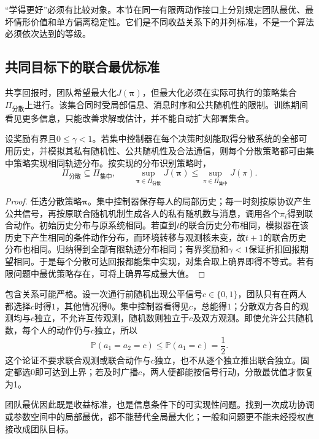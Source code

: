 “学得更好”必须有比较对象。本节在同一有限两动作接口上分别规定团队最优、最坏情形价值和单方偏离稳定性。它们是不同收益关系下的并列标准，不是一个算法必须依次达到的等级。

\subsection{共同目标下的联合最优标准}
\label{sec:rl-multi-agent-team}

共享回报时，团队希望最大化$J(\bm\pi)$，但最大化必须在实际可执行的策略集合$\Pi_{\text{分散}}$上进行。该集合同时受局部信息、消息时序和公共随机性的限制。训练期间看见更多信息，只能改善求解或估计，并不能自动扩大部署集合。

\begin{theorem}[集中与分散策略的可行集合]
\label{thm:rl-multi-agent-inclusion}
设奖励有界且$0\leq\gamma<1$。若集中控制器在每个决策时刻能取得分散系统的全部可用历史，并模拟其私有随机性、公共随机性及合法通信，则每个分散策略都可由集中策略实现相同轨迹分布。按实现的分布识别策略时，
\[
 \Pi_{\text{分散}}\subseteq\Pi_{\text{集中}},
 \qquad
 \sup_{\bm\pi\in\Pi_{\text{分散}}}J(\bm\pi)
 \leq
 \sup_{\pi\in\Pi_{\text{集中}}}J(\pi).
\]
\end{theorem}
\begin{proof}
任选分散策略$\bm\pi$。集中控制器保存每人的局部历史；每一时刻按原协议产生公共信号，再按原联合随机机制生成各人的私有随机数与消息，调用各个$\pi_i$得到联合动作。初始历史分布与原系统相同。若直到$t$的联合历史分布相同，模拟器在该历史下产生相同的条件动作分布，而环境转移与观测核未变，故$t+1$的联合历史分布也相同。归纳得到全部有限轨迹分布相同；有界奖励和$\gamma<1$保证折扣回报期望相同。于是每个分散可达回报都能集中实现，对集合取上确界即得不等式。若有限问题中最优策略存在，可将上确界写成最大值。
\end{proof}

包含关系可能严格。设一次通行前随机出现公平信号$c\in\{0,1\}$，团队只有在两人都选择$c$时得$1$，其他情况得$0$。集中控制器看得见$c$，总能得$1$；分散双方各自的观测均与$c$独立，不允许互传观测，随机数则独立于$c$及双方观测。即使允许公共随机数，每个人的动作仍与$c$独立，所以
\[
 \mathbb P(a_1=a_2=c)\leq\mathbb P(a_1=c)=\frac12.
\]
这个论证不要求联合观测或联合动作与$c$独立，也不从逐个独立推出联合独立。固定都选0即可达到上界；若及时广播$c$，两人便都能按信号行动，分散最优值才恢复为1。

团队最优因此既是收益标准，也是信息条件下的可实现性问题。找到一次成功协调或参数空间中的局部最优，都不能替代全局最大化；一般和问题更不能未经授权直接改成团队目标。

